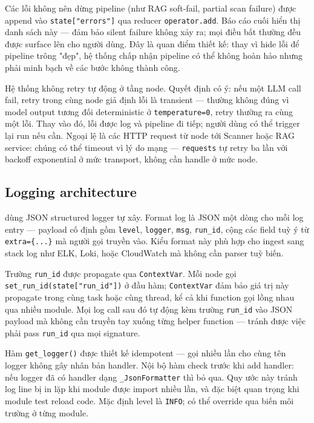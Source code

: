Các lỗi không nên dừng pipeline (như RAG soft-fail, partial scan failure) được append vào \texttt{state["errors"]} qua reducer \texttt{operator.add}. Báo cáo cuối hiển thị danh sách này — đảm bảo silent failure không xảy ra; mọi điều bất thường đều được surface lên cho người dùng. Đây là quan điểm thiết kế: thay vì hide lỗi để pipeline trông "đẹp", hệ thống chấp nhận pipeline có thể không hoàn hảo nhưng phải minh bạch về các bước không thành công.

Hệ thống không retry tự động ở tầng node. Quyết định có ý: nếu một LLM call fail, retry trong cùng node giả định lỗi là transient — thường không đúng vì model output tương đối deterministic ở \texttt{temperature=0}, retry thường ra cùng một lỗi. Thay vào đó, lỗi được log và pipeline đi tiếp; người dùng có thể trigger lại run nếu cần. Ngoại lệ là các HTTP request từ node tới Scanner hoặc RAG service: chúng có thể timeout vì lý do mạng — \texttt{requests} tự retry ba lần với backoff exponential ở mức transport, không cần handle ở mức node.

\subsection{Logging architecture}
\label{sub:logging}

\sysnameshort{} dùng JSON structured logger tự xây. Format log là JSON một dòng cho mỗi log entry — payload cố định gồm \texttt{level}, \texttt{logger}, \texttt{msg}, \texttt{run\_id}, cộng các field tuỳ ý từ \texttt{extra=\{...\}} mà người gọi truyền vào. Kiểu format này phù hợp cho ingest sang stack log như ELK, Loki, hoặc CloudWatch mà không cần parser tuỳ biến.

Trường \texttt{run\_id} được propagate qua \texttt{ContextVar}. Mỗi node gọi \texttt{set\_run\_id(state["run\_id"])} ở đầu hàm; \texttt{ContextVar} đảm bảo giá trị này propagate trong cùng task hoặc cùng thread, kể cả khi function gọi lồng nhau qua nhiều module. Mọi log call sau đó tự động kèm trường \texttt{run\_id} vào JSON payload mà không cần truyền tay xuống từng helper function — tránh được việc phải pass \texttt{run\_id} qua mọi signature.

Hàm \texttt{get\_logger()} được thiết kế idempotent — gọi nhiều lần cho cùng tên logger không gây nhân bản handler. Nội bộ hàm check trước khi add handler: nếu logger đã có handler dạng \texttt{\_JsonFormatter} thì bỏ qua. Quy ước này tránh log line bị in lặp khi module được import nhiều lần, và đặc biệt quan trọng khi module test reload code. Mặc định level là \texttt{INFO}; có thể override qua biến môi trường ở từng module.

